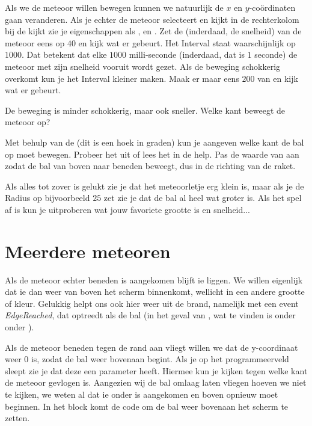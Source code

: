 Als we de meteoor willen bewegen kunnen we natuurlijk de $x$ en $y$-co\"ordinaten gaan veranderen. Als je echter de meteoor selecteert en kijkt in de rechterkolom bij de  kijkt zie je eigenschappen als ,  en . Zet de  (inderdaad, de snelheid) van de meteoor eens op $40$ en kijk wat er gebeurt. 
\runOpTelefoon{}
Het Interval staat waarschijnlijk op $1000$. Dat betekent dat elke $1000$ milli-seconde (inderdaad, dat is $1$ seconde) de meteoor met zijn snelheid vooruit wordt gezet. Als de beweging schokkerig overkomt kun je het Interval kleiner maken. Maak er maar eens $200$ van en kijk wat er gebeurt. 
\runOpTelefoon{}

De beweging is minder schokkerig, maar ook sneller. Welke kant beweegt de meteoor op? 


\begin{opgave}
   \opgVraag
	Met behulp van de  (dit is een hoek in graden) kun je aangeven welke kant de bal op moet bewegen. Probeer het uit of lees het in de help. 
	Pas de waarde van  aan zodat de bal van boven naar beneden beweegt, dus in de richting van de raket. 
\end{opgave}

Als alles tot zover is gelukt zie je dat het meteoorletje erg klein is, maar als je de Radius op bijvoorbeeld $25$ zet zie je dat de bal al heel wat groter is. Als het spel af is kun je uitproberen wat jouw favoriete grootte is en snelheid... 


\section{Meerdere meteoren}
Als de meteoor echter beneden is aangekomen blijft ie liggen. We willen eigenlijk dat ie dan weer van boven het scherm binnenkomt,  wellicht in een andere grootte of kleur. Gelukkig helpt \ai ons ook hier weer uit de brand, namelijk met een event \emph{EdgeReached}, dat optreedt als de bal (in het geval van , wat te vinden is onder  onder ). 

Als de meteoor beneden tegen de rand aan vliegt willen we dat de y-coordinaat weer 0 is, zodat de bal weer bovenaan begint. 
Als je  op het programmeerveld sleept zie je dat deze een parameter  heeft. Hiermee kun je kijken tegen welke kant de meteoor gevlogen is. Aangezien wij de bal omlaag laten vliegen hoeven we niet te kijken, we weten al dat ie onder is aangekomen en boven opnieuw moet beginnen. In het block komt de code om de bal weer bovenaan het scherm te zetten. 

